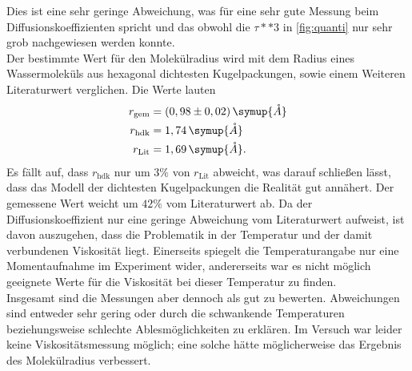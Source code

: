 Dies ist eine sehr geringe Abweichung, was für eine sehr gute Messung beim Diffusionskoeffizienten spricht
und das obwohl die $\tau**3$ in \autoref{fig:quanti} nur sehr grob nachgewiesen werden konnte.\\
Der bestimmte Wert für den Molekülradius wird mit dem Radius eines Wassermoleküls aus hexagonal dichtesten 
Kugelpackungen, sowie einem Weiteren Literaturwert\cite{radius} verglichen. Die Werte lauten
\begin{align*}
    r_{\text{gem}} &= (0,98 \pm 0,02) \, \symup{\mathring{A}}\\
    r_{\text{hdk}} &=1,74 \, \symup{\mathring{A}} \\
    r_{\text{Lit}} &= 1,69 \, \symup{\mathring{A}}. 
\end{align*}
Es fällt auf, dass $r_{\text{hdk}}$ nur um $3\%$ von $r_{\text{Lit}}$ abweicht, was darauf schließen lässt, 
dass das Modell der dichtesten Kugelpackungen die Realität gut annähert. Der gemessene Wert weicht 
um $42\%$ vom Literaturwert ab. Da der Diffusionskoeffizient nur eine geringe Abweichung vom 
Literaturwert aufweist, ist davon auszugehen, dass die Problematik in der Temperatur und der damit 
verbundenen Viskosität liegt. Einerseits spiegelt die Temperaturangabe nur eine Momentaufnahme im Experiment 
wider, andererseits war es nicht möglich geeignete Werte für die Viskosität bei dieser Temperatur zu finden. \\
Insgesamt sind die Messungen aber dennoch als gut zu bewerten. Abweichungen sind entweder sehr gering oder 
durch die schwankende Temperaturen beziehungsweise schlechte Ablesmöglichkeiten zu erklären.
Im Versuch war leider keine Viskositätsmessung möglich; eine solche hätte möglicherweise das Ergebnis des
Molekülradius verbessert.

